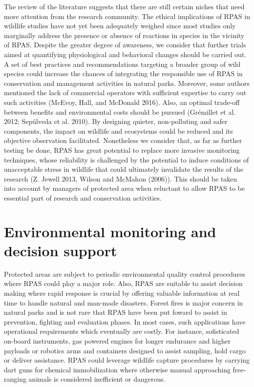 \documentclass[]{interact}
\theoremstyle{plain}%
\theoremstyle{definition}
\theoremstyle{remark}
\begin{document}
The review of the literature suggests that there are still certain
niches that need more attention from the research community. The ethical
implications of RPAS in wildlife studies have not yet been adequately
weighed since most studies only marginally address the presence or
absence of reactions in species in the vicinity of RPAS. Despite the
greater degree of awareness, we consider that further trials aimed at
quantifying physiological and behavioral changes should be carried out.
A set of best practices and recommendations targeting a broader group of
wild species could increase the chances of integrating the responsible
use of RPAS in conservation and management activities in natural parks.
Moreover, some authors mentioned the lack of commercial operators with
sufficient expertise to carry out such activities (McEvoy, Hall, and
McDonald 2016). Also, an optimal trade-off between benefits and
environmental costs should be pursued (Grémillet et al. 2012; Sepúlveda
et al. 2010). By designing quieter, non-polluting and safer components,
the impact on wildlife and ecosystems could be reduced and its objective
observation facilitated. Nonetheless we consider that, as far as further
testing be done, RPAS has great potential to replace more invasive
monitoring techniques, whose reliability is challenged by the potential
to induce conditions of unacceptable stress in wildlife that could
ultimately invalidate the results of the research (Z. Jewell 2013,
Wilson and McMahon (2006)). This should be taken into account by
managers of protected area when reluctant to allow RPAS to be essential
part of research and conservation activities.

\section{Environmental monitoring and decision
support}\label{environmental-monitoring-and-decision-support}

Protected areas are subject to periodic environmental quality control
procedures where RPAS could play a major role. Also, RPAS are suitable
to assist decision making where rapid response is crucial by offering
valuable information at real time to handle natural and man-made
disasters. Forest fires is major concern in natural parks and is not
rare that RPAS have been put foward to assist in prevention, fighting
and evaluation phases. In most cases, such applications have operational
requirements which eventually are costly. For instance, sofisticated
on-board instruments, gas powered engines for longer endurance and
higher payloads or robotics arms and containers designed to assist
sampling, hold cargo or deliver assistance. RPAS could leverage wildlife
capture procedures by carrying dart guns for chemical immobilization
where otherwise manual approaching free-ranging animals is considered
inefficient or dangerous.
\end{document}
